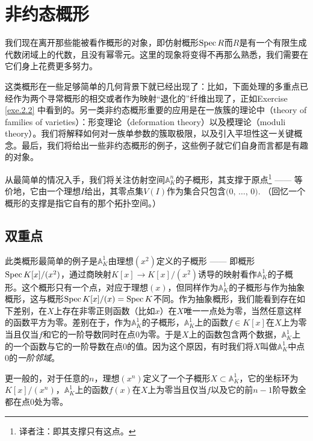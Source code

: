 \section{非约态概形}

我们现在离开那些能被看作概形的对象，即仿射概形$\operatorname{Spec} R$而$R$是有一个有限生成代数闭域上的代数，且没有幂零元。这里的现象将变得不再那么熟悉，我们需要在它们身上花费更多努力。

这类概形在一些足够简单的几何背景下就已经出现了：比如，下面处理的多重点已经作为两个寻常概形的相交或者作为映射“退化的”纤维出现了，正如Exercise \ref{exe.2.2} 中看到的。另一类非约态概形重要的应用是在一族簇的理论中（theory of families of varieties）：形变理论（deformation theory）以及模理论（moduli theory）。我们将解释如何对一族单参数的簇取极限，以及引入平坦性这一关键概念。最后，我们将给出一些非约态概形的例子，这些例子就它们自身而言都是有趣的对象。

从最简单的情况入手，我们将关注仿射空间$\mathbb{A}_K^n$的子概形，其支撑于原点\footnote{译者注：即其支撑只有这点。} ------ 等价地，它由一个理想$I$给出，其零点集$V(I)$作为集合只包含$(0$, $\dots$, $0)$. （回忆一个概形的支撑是指它自有的那个拓扑空间。）

\subsection{双重点}\label{s.2.3.1}
\begin{exa}
	此类概形最简单的例子是$\mathbb{A}_K^1$由理想$(x^2)$定义的子概形 ------ 即概形$\operatorname{Spec} K[x]/(x^2)$，通过商映射$K[x]\to K[x]/(x^2)$诱导的映射看作$\mathbb{A}_K^1$的子概形。这个概形只有一个点，对应于理想$(x)$，但同样作为$\mathbb{A}_K^1$的子概形与作为抽象概形，这与概形$\operatorname{Spec} K[x]/(x)=\operatorname{Spec} K$不同。作为抽象概形，我们能看到存在如下差别，在$X$上存在非零正则函数（比如$x$）在$X$唯一一点处为零，当然任意这样的函数平方为零。差别在于，作为$\mathbb{A}_K^1$的子概形，$\mathbb{A}_K^1$上的函数$f\in K[x]$在$X$上为零当且仅当$f$和它的一阶导数同时在点$0$为零。于是$X$上的函数包含两个数据，$\mathbb{A}_K^1$上的一个函数与它的一阶导数在点$0$的值。因为这个原因，有时我们将$X$叫做$\mathbb{A}_K^1$中点$0$的\textit{一阶邻域}。
\end{exa}

更一般的，对于任意的$n$，理想$(x^n)$定义了一个子概形$X\subset \mathbb{A}_K^1$，它的坐标环为$K[x]/(x^n)$，$\mathbb{A}_K^1$上的函数$f(x)$在$X$上为零当且仅当$f$以及它的前$n-1$阶导数全都在点$0$处为零。

